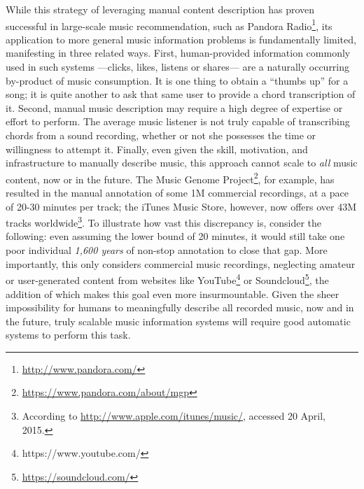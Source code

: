 While this strategy of leveraging manual content description has proven successful in large-scale music recommendation, such as Pandora Radio\footnote{\url{http://www.pandora.com/}}, its application to more general music information problems is fundamentally limited, manifesting in three related ways.
First, human-provided information commonly used in such systems ---clicks, likes, listens or shares--- are a naturally occurring by-product of music consumption.
It is one thing to obtain a ``thumbs up'' for a song; it is quite another to ask that same user to provide a chord transcription of it.
Second, manual music description may require a high degree of expertise or effort to perform.
The average music listener is not truly capable of transcribing chords from a sound recording, whether or not she possesses the time or willingness to attempt it.
Finally, even given the skill, motivation, and infrastructure to manually describe music, this approach cannot scale to \emph{all} music content, now or in the future.
The Music Genome Project\footnote{\url{https://www.pandora.com/about/mgp}}, for example, has resulted in the manual annotation of some 1M commercial recordings, at a pace of 20-30 minutes per track;
the iTunes Music Store, however, now offers over 43M tracks worldwide\footnote{According to \url{http://www.apple.com/itunes/music/}, accessed 20 April, 2015.}.
To illustrate how vast this discrepancy is, consider the following: even assuming the lower bound of 20 minutes, it would still take one poor individual \emph{1,600 years} of non-stop annotation to close that gap.
More importantly, this only considers commercial music recordings, neglecting amateur or user-generated content from websites like YouTube\footnote{https://www.youtube.com/} or Soundcloud\footnote{\url{https://soundcloud.com/}}, the addition of which makes this goal even more insurmountable.
Given the sheer impossibility for humans to meaningfully describe all recorded music, now and in the future, truly scalable music information systems will require good automatic systems to perform this task.

